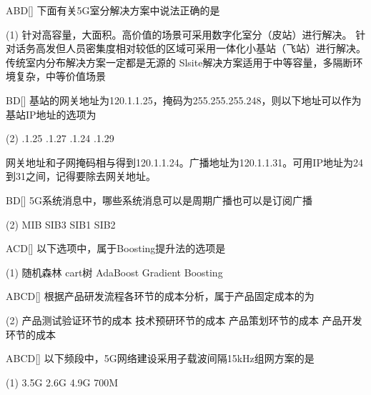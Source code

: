 \begin{choice}{\;ABD\;}[]
	下面有关5G室分解决方案中说法正确的是
	\begin{tasks}(1)
		\task 针对高容量，大面积。高价值的场景可采用数字化室分（皮站）进行解决。
		\task 针对话务高发但人员密集度相对较低的区域可采用一体化小基站（飞站）进行解决。
		\task 传统室内分布解决方案一定都是无源的
		\task Slsite解决方案适用于中等容量，多隔断环境复杂，中等价值场景
	\end{tasks}
\end{choice}


\begin{choice}{\;BD\;}[]
	基站的网关地址为120.1.1.25，掩码为255.255.255.248，则以下地址可以作为基站IP地址的选项为
	\begin{tasks}(2)
		.1.25
		.1.27
		.1.24
		.1.29
	\end{tasks}
\end{choice}
\begin{solution}
 网关地址和子网掩码相与得到120.1.1.24。广播地址为120.1.1.31。可用IP地址为24到31之间，记得要除去网关地址。
\end{solution}

\begin{choice}{\;BD\;}[]
	5G系统消息中，哪些系统消息可以是周期广播也可以是订阅广播
	\begin{tasks}(2)
		\task MIB
		\task SIB3
		\task SIB1
		\task SIB2
	\end{tasks}
\end{choice}


\begin{choice}{\;ACD\;}[]
	以下选项中，属于Boosting提升法的选项是
	\begin{tasks}(1)
		\task 随机森林
		\task cart树
		\task AdaBoost
		\task Gradient Boosting
	\end{tasks}
\end{choice}


\begin{choice}{\;ABCD\;}[]
	根据产品研发流程各环节的成本分析，属于产品固定成本的为
	\begin{tasks}(2)
		\task 产品测试验证环节的成本
		\task 技术预研环节的成本
		\task 产品策划环节的成本
		\task 产品开发环节的成本
	\end{tasks}
\end{choice}

\begin{choice}{\;ABCD\;}[]
	以下频段中，5G网络建设采用子载波间隔15kHz组网方案的是
	\begin{tasks}(1)
		\task3.5G
		\task 2.6G
		\task 4.9G
		\task 700M
	\end{tasks}
\end{choice}

